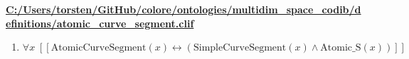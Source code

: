 \documentclass{article}
\begin{document}
\textbf{\url{C:/Users/torsten/GitHub/colore/ontologies/multidim\_space\_codib/definitions/atomic\_curve\_segment.clif}}

\begin{enumerate}
\item $\forall x\;  \left[ \left[ \textrm{AtomicCurveSegment}(x) \leftrightarrow \left(\textrm{SimpleCurveSegment}(x) \land \textrm{Atomic\_S}(x)\right) \right] \right]$
\end{enumerate}
\end{document}
